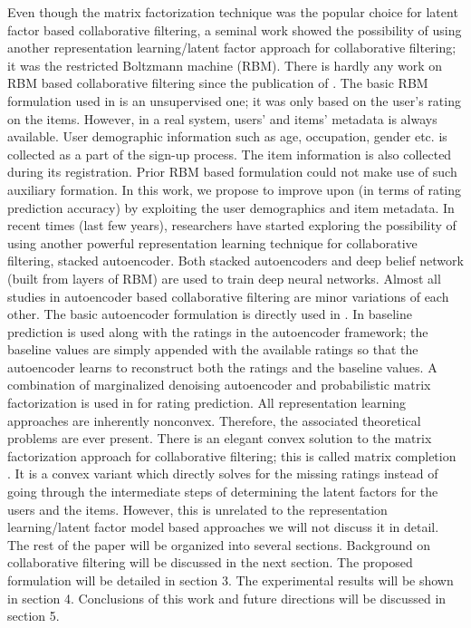 \documentclass[conference]{IEEEtran}
\begin{document}
Even though the matrix factorization technique was the popular choice for latent factor based collaborative filtering, a seminal work \cite{Salakhutdinov} showed the possibility of using another representation learning/latent factor approach for collaborative filtering; it was the restricted Boltzmann machine (RBM). There is hardly any work on RBM based collaborative filtering since the publication of \cite{Salakhutdinov}.
The basic RBM formulation used in \cite{Salakhutdinov} is an unsupervised one; it was only based on the user’s rating on the items. However, in a real system, users’ and items’ metadata is always available. User demographic information such as age, occupation, gender etc. is collected as a part of the sign-up process. The item information is also collected during its registration. Prior RBM based formulation could not make use of such auxiliary formation. In this work, we propose to improve upon \cite{Salakhutdinov} (in terms of rating prediction accuracy) by exploiting the user demographics and item metadata.
In recent times (last few years), researchers have started exploring the possibility of using another powerful representation learning technique for collaborative filtering, stacked autoencoder. Both stacked autoencoders and deep belief network (built from layers of RBM) are used to train deep neural networks. Almost all studies in autoencoder based collaborative filtering are minor variations of each other. The basic autoencoder formulation is directly used in \cite{Strub1,Ouyang2014,Wu}. In \cite{Strub2} baseline prediction is used along with the ratings in the autoencoder framework; the baseline values are simply appended with the available ratings so that the autoencoder learns to reconstruct both the ratings and the baseline values. A combination of marginalized denoising autoencoder and probabilistic matrix factorization is used in \cite{Li} for rating prediction.
All representation learning approaches are inherently nonconvex. Therefore, the associated theoretical problems are ever present. There is an elegant convex solution to the matrix factorization approach for collaborative filtering; this is called matrix completion \cite{Abernethy,pmlr-v19-shamir11a}. It is a convex variant which directly solves for the missing ratings instead of going through the intermediate steps of determining the latent factors for the users and the items. However, this is unrelated to the representation learning/latent factor model based approaches we will not discuss it in detail.
The rest of the paper will be organized into several sections. Background on collaborative filtering will be discussed in the next section. The proposed formulation will be detailed in section 3. The experimental results will be shown in section 4. Conclusions of this work and future directions will be discussed in section 5.
\end{document}
